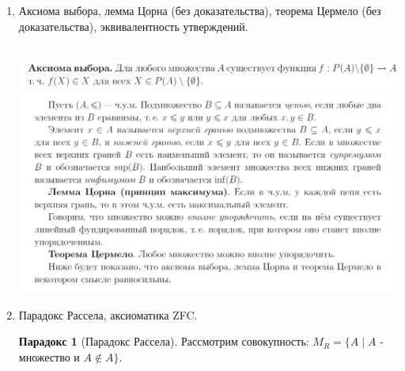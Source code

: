 \documentclass[a4paper]{article}
\newtheorem*{theorem*}{Теорема}
\theoremstyle{definition}
\newtheorem*{paradoks}{Парадокс}
\begin{document}
\begin{enumerate}
\begin{proof}
         Получаем последовательность $x > f(x) > f(f(x)) > ...$, противоречие.\\ \\
         По доказанной лемме $S_1 \subseteq S_2$ или $S_2 \subseteq S_1$. Пусть $S_1 \subseteq S_2$. Выберем $x_0 \in S_2 \backslash S_1$.\\
         Мы рассматриваем эти сегменты как в.у.м. с индуцированным из $A$ порядком. Допустим, что $f: S_2\rightarrow S_1$ - изоморфизм. Рассматривая $f$ как функцию из $S_2$ в $S_2$, видим, что она инъективна и монотонна. Следовательно, $f(x_0) \geq x_0$. Поскольку $S_1$ начальный сегмент и $f(x_0) \in S_1$, получаем, что $x_0 \in S_1$, противоречие.
       \end{proof}
       \begin{theorem*}[о сравнимости в.у.м.]
        Если даны два в.у.м., то одно из них изоморфно начальному сегменту другого.
       \end{theorem*}
 \item Аксиома выбора, лемма Цорна (без доказательства), теорема Цермело (без доказательства), эквивалентность утверждений.
       \begin{flushright}
        \mbox{}\\ \includegraphics[scale=0.4]{15_1.jpg}\\
        \includegraphics[scale=0.4]{15_2.jpg}\\
       \end{flushright}
 \item Парадокс Рассела, аксиоматика ZFC.
       \begin{paradoks}[Парадокс Рассела]
        Рассмотрим совокупность:
        $M_{R} = \{ A \mid  A$ - множество и $A  \notin A \}$.\\

\end{paradoks}
\end{enumerate}
\end{document}
